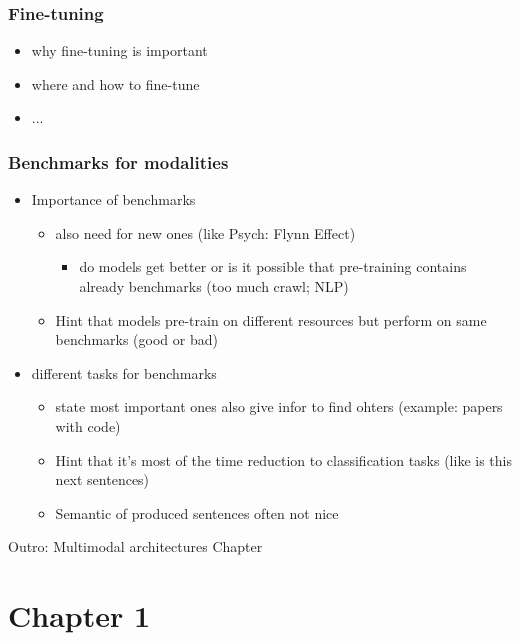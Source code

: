 \documentclass[
]{krantz}
\begin{document}
\subsection{Fine-tuning}
  \begin{itemize}
    \item why fine-tuning is important
    \item where and how to fine-tune
    \item ... 
  \end{itemize}

\subsection{Benchmarks for modalities}
  \begin{itemize}
    \item Importance of benchmarks
      \begin{itemize}
        \item also need for new ones (like Psych: Flynn Effect)
          \begin{itemize}
            \item do models get better or is it possible that pre-training                         contains already benchmarks (too much crawl; NLP)
          \end{itemize}
        \item Hint that models pre-train on different resources but perform on same benchmarks (good or bad)
        \end{itemize}
      \item different tasks for benchmarks
        \begin{itemize}
          \item state most important ones also give infor to find ohters (example: papers with code)
          \item Hint that it's most of the time reduction to classification tasks (like is this next sentences)
          \item Semantic of produced sentences often not nice
        \end{itemize}
  \end{itemize}

Outro: Multimodal architectures Chapter

\hypertarget{chapter-1-1}{%
\chapter{Chapter 1}\label{chapter-1-1}}
\end{document}

